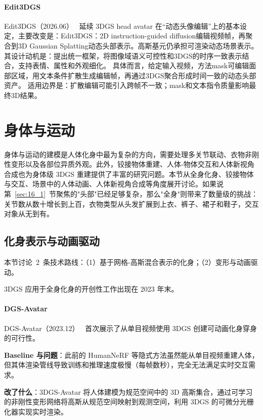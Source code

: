 \paragraph{Edit3DGS}
Edit3DGS（2026.06）~\cite{2606_17432} 延续 3DGS head avatar 在“动态头像编辑”上的基本设定，主要改变是：Edit3DGS：2D instruction-guided diffusion编辑视频帧，再聚合到3D Gaussian Splatting动态头部表示。高斯基元仍承担可渲染动态场景表示。
其设计动机是：提出统一框架，将图像域语义可控性和3DGS的时序一致表示结合，支持表情、属性和外观细化。
具体而言，给定输入视频，方法mask可编辑面部区域，用文本条件扩散生成编辑帧，再通过3DGS聚合形成时间一致的动态头部资产。
适用边界是：扩散编辑可能引入跨帧不一致；mask和文本指令质量影响最终3D结果。
\section{身体与运动}
\label{sec:16_2}

身体与运动的建模是人体化身中最为复杂的方向，需要处理多关节联动、衣物非刚性变形以及各部位异质外观。此外，铰接物体重建、人体-物体交互和人体新视角合成也为身体级 3DGS 重建提供了丰富的研究问题。本节从全身化身、铰接物体与交互、场景中的人体动画、人体新视角合成等角度展开讨论。如果说第~\ref{sec:16_1}~节聚焦的"头部"已经足够复杂，那么"全身"则带来了数量级的挑战：关节数从数十增长到上百，衣物类型从头发扩展到上衣、裤子、裙子和鞋子，交互对象从无到有。

\subsection{化身表示与动画驱动}

本节讨论~2~条技术路线：（1）基于网格-高斯混合表示的化身；（2）变形与动画驱动。

3DGS 应用于全身化身的开创性工作出现在 2023 年末。

\paragraph{DGS-Avatar}

DGS-Avatar（2023.12）~\cite{2312_09228} 首次展示了从单目视频使用 3DGS 创建可动画化身穿身的可行性。

\textbf{Baseline 与问题}：此前的 HumanNeRF 等隐式方法虽然能从单目视频重建人体，但其体渲染管线导致训练和推理速度极慢（每帧数秒），完全无法满足实时交互需求。

\textbf{改了什么}：3DGS-Avatar 将人体建模为规范空间中的 3D 高斯集合，通过可学习的非刚性变形网络将高斯从规范空间映射到观测空间，利用 3DGS 的可微分光栅化器实现实时渲染。

